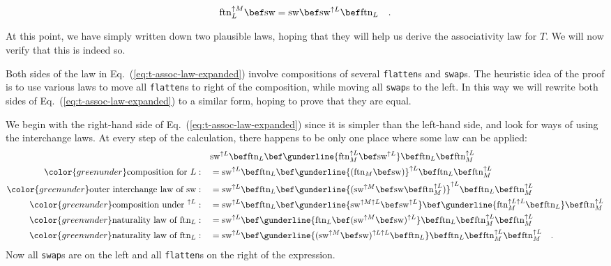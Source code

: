 ~\vspace{-0.2\baselineskip}
\begin{equation}
\text{ftn}_{L}^{\uparrow M}\bef\text{sw}=\text{sw}\bef\text{sw}^{\uparrow L}\bef\text{ftn}_{L}\quad.\label{eq:swap-law-4-L-interchange}
\end{equation}

At this point, we have simply written down two plausible laws, hoping
that they will help us derive the associativity law for $T$. We will
now verify that this is indeed so.

Both sides of the law in Eq.~(\ref{eq:t-assoc-law-expanded}) involve
compositions of several \lstinline!flatten!s and \lstinline!swap!s.
The heuristic idea of the proof is to use various laws to move all
\lstinline!flatten!s to right of the composition, while moving all
\lstinline!swap!s to the left. In this way we will rewrite both sides
of Eq.~(\ref{eq:t-assoc-law-expanded}) to a similar form, hoping
to prove that they are equal.

We begin with the right-hand side of Eq.~(\ref{eq:t-assoc-law-expanded})
since it is simpler than the left-hand side, and look for ways of
using the interchange laws. At every step of the calculation, there
happens to be only one place where some law can be applied:
\begin{align*}
 & \text{sw}^{\uparrow L}\bef\text{ftn}_{L}\bef\gunderline{\text{ftn}_{M}^{\uparrow L}\bef\text{sw}^{\uparrow L}}\bef\text{ftn}_{L}\bef\text{ftn}_{M}^{\uparrow L}\\
{\color{greenunder}\text{composition for }L:}\quad & =\text{sw}^{\uparrow L}\bef\text{ftn}_{L}\bef\gunderline{(\text{ftn}_{M}\bef\text{sw})}^{\uparrow L}\bef\text{ftn}_{L}\bef\text{ftn}_{M}^{\uparrow L}\\
{\color{greenunder}\text{outer interchange law of }\text{sw}:}\quad & =\text{sw}^{\uparrow L}\bef\text{ftn}_{L}\bef\gunderline{(\text{sw}^{\uparrow M}\bef\text{sw}\bef\text{ftn}_{M}^{\uparrow L})}^{\uparrow L}\bef\text{ftn}_{L}\bef\text{ftn}_{M}^{\uparrow L}\\
{\color{greenunder}\text{composition under }^{\uparrow L}:}\quad & =\text{sw}^{\uparrow L}\bef\text{ftn}_{L}\bef\gunderline{\text{sw}^{\uparrow M\uparrow L}\bef\text{sw}^{\uparrow L}}\bef\gunderline{\text{ftn}_{M}^{\uparrow L\uparrow L}\bef\text{ftn}_{L}}\bef\text{ftn}_{M}^{\uparrow L}\\
{\color{greenunder}\text{naturality law of }\text{ftn}_{L}:}\quad & =\text{sw}^{\uparrow L}\bef\gunderline{\text{ftn}_{L}\bef(\text{sw}^{\uparrow M}\bef\text{sw})^{\uparrow L}}\bef\text{ftn}_{L}\bef\text{ftn}_{M}^{\uparrow L}\bef\text{ftn}_{M}^{\uparrow L}\\
{\color{greenunder}\text{naturality law of }\text{ftn}_{L}:}\quad & =\text{sw}^{\uparrow L}\bef\gunderline{(\text{sw}^{\uparrow M}\bef\text{sw})^{\uparrow L\uparrow L}\bef\text{ftn}_{L}}\bef\text{ftn}_{L}\bef\text{ftn}_{M}^{\uparrow L}\bef\text{ftn}_{M}^{\uparrow L}\quad.
\end{align*}
Now all \lstinline!swap!s are on the left and all \lstinline!flatten!s
on the right of the expression.

